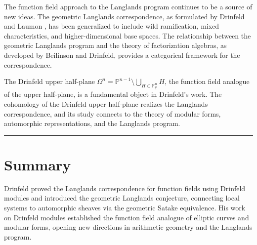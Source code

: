 The function field approach to the Langlands program continues to be a source of new ideas. The geometric Langlands correspondence, as formulated by Drinfeld and Laumon \cite{drinfeld1987}, has been generalized to include wild ramification, mixed characteristics, and higher-dimensional base spaces. The relationship between the geometric Langlands program and the theory of factorization algebras, as developed by Beilinson and Drinfeld, provides a categorical framework for the correspondence.

The Drinfeld upper half-plane $\Omega^n = \mathbb{P}^{n-1} \setminus \bigcup_{H \subset \mathbb{F}_q^n} H$, the function field analogue of the upper half-plane, is a fundamental object in Drinfeld's work. The cohomology of the Drinfeld upper half-plane realizes the Langlands correspondence, and its study connects to the theory of modular forms, automorphic representations, and the Langlands program.

\begin{center}\rule{0.5\linewidth}{0.5pt}\end{center}

\section*{Summary}

Drinfeld proved the Langlands correspondence for function fields using Drinfeld modules and introduced the geometric Langlands conjecture, connecting local systems to automorphic sheaves via the geometric Satake equivalence. His work on Drinfeld modules established the function field analogue of elliptic curves and modular forms, opening new directions in arithmetic geometry and the Langlands program.
